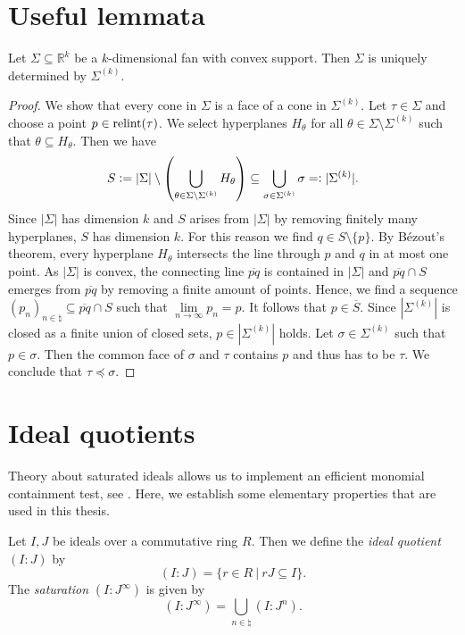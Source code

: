 \chapter{Useful lemmata}

\begin{lemmaApp}
	\label{lemma:convex_fan_maximal_cones}
	Let $\Sigma\subseteq\mathbb{R}^k$ be a $k$-dimensional fan with convex support. Then $\Sigma$ is uniquely determined by $\Sigma^{(k)}$.
\end{lemmaApp}
\begin{proof}
	We show that every cone in $\Sigma$ is a face of a cone in $\Sigma^{(k)}$. Let $\tau\in\Sigma$ and choose a point $p\in\text{relint}(\tau)$. We select hyperplanes $H_\theta$ for all $\theta\in\Sigma\setminus\Sigma^{(k)}$ such that $\theta\subseteq H_\theta$. Then we have
	$$S \mathrel{\mathop:}= |\Sigma| \setminus \left(\bigcup_{\theta\in\Sigma\setminus\Sigma^{(k)}} H_\theta\right) \subseteq \bigcup_{\sigma\in\Sigma^{(k)}} \sigma =\mathrel{\mathop:} |\Sigma^{(k)}|.$$
	Since $|\Sigma|$ has dimension $k$ and $S$ arises from $|\Sigma|$ by removing finitely many hyperplanes, $S$ has dimension $k$. For this reason we find $q\in S \setminus\{p\}$. By Bézout's theorem, every hyperplane $H_\theta$ intersects the line through $p$ and $q$ in at most one point. As $|\Sigma|$ is convex, the connecting line $\overline{pq}$ is contained in $|\Sigma|$ and $\overline{pq} \cap S$ emerges from $\overline{pq}$ by removing a finite amount of points. Hence, we find a sequence $(p_n)_{n\in\natural}\subseteq \overline{pq} \cap S$ such that $\lim\limits_{n\rightarrow\infty} p_n = p$. It follows that $p\in\overline{S}$. Since $|\Sigma^{(k)}|$ is closed as a finite union of closed sets, $p\in|\Sigma^{(k)}|$ holds. Let $\sigma\in\Sigma^{(k)}$ such that $p\in\sigma$. Then the common face of $\sigma$ and $\tau$ contains $p$ and thus has to be $\tau$. We conclude that $\tau\preceq\sigma$.
\end{proof}

\chapter{Ideal quotients}
\label{appendix:ideal_quotients}

Theory about saturated ideals allows us to implement an efficient monomial containment test, see \cite{gitfan_symmetry}. Here, we establish some elementary properties that are used in this thesis.

\begin{defiApp}
	Let $I,J$ be ideals over a commutative ring $R$. Then we define the \emph{ideal quotient} $(I:J)$ by
	$$(I:J) = \{r\in R\ |\ rJ\subseteq I\}.$$
	The \emph{saturation} $(I:J^\infty)$ is given by
	$$(I:J^\infty) = \bigcup_{n\in \natural}(I:J^n).$$
\end{defiApp}

